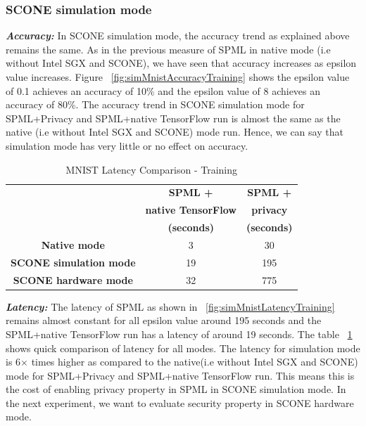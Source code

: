 \subsubsection{SCONE simulation mode}
\textbf{\textit{Accuracy: }} In SCONE simulation mode, the accuracy trend as explained above remains the same. As in the previous measure of SPML in native mode (i.e without Intel SGX and SCONE), we have seen that accuracy increases as epsilon value increases. Figure ~\ref{fig:simMnistAccuracyTraining} shows the epsilon value of 0.1 achieves an accuracy of 10\% and the epsilon value of 8 achieves an accuracy of 80\%. The accuracy trend in SCONE simulation mode for SPML+Privacy and SPML+native TensorFlow run is almost the same as the native (i.e without Intel SGX and SCONE) mode run. Hence, we can say that simulation mode has very little or no effect on accuracy.
\begin{table}[h!]
  \begin{center}
    \caption{MNIST Latency Comparison - Training }
    \label{tab:mnistLatencyTraining}
    \begin{tabular}{|c|c|c|}
      \hline
      \textbf{} & \textbf{SPML +} & \textbf{SPML +} \\
      \textbf{} & \textbf{native TensorFlow} & \textbf{privacy} \\
      \textbf{} & \textbf{(seconds)} & \textbf{(seconds)} \\
      \hline
      \textbf{Native mode} & 3        &   30\\
      \hline
      \textbf{SCONE simulation mode} &  19       &     195\\
      \hline    
      \textbf{SCONE hardware mode} &    32     &      775\\
      \hline
    \end{tabular}
   \end{center}
\end{table}
\newline
\newline
\textbf{\textit{Latency: }}The latency of SPML as shown in ~\ref{fig:simMnistLatencyTraining} remains almost constant for all epsilon value around 195 seconds and the SPML+native TensorFlow run has a latency of around 19 seconds. The table ~\ref{tab:mnistLatencyTraining} shows quick comparison of latency for all modes. The latency for simulation mode is 6$\times$ times higher as compared to the native(i.e without Intel SGX and SCONE) mode for SPML+Privacy and SPML+native TensorFlow run. This means this is the cost of enabling privacy property in SPML in SCONE simulation mode. In the next experiment, we want to evaluate security property in SCONE hardware mode.

